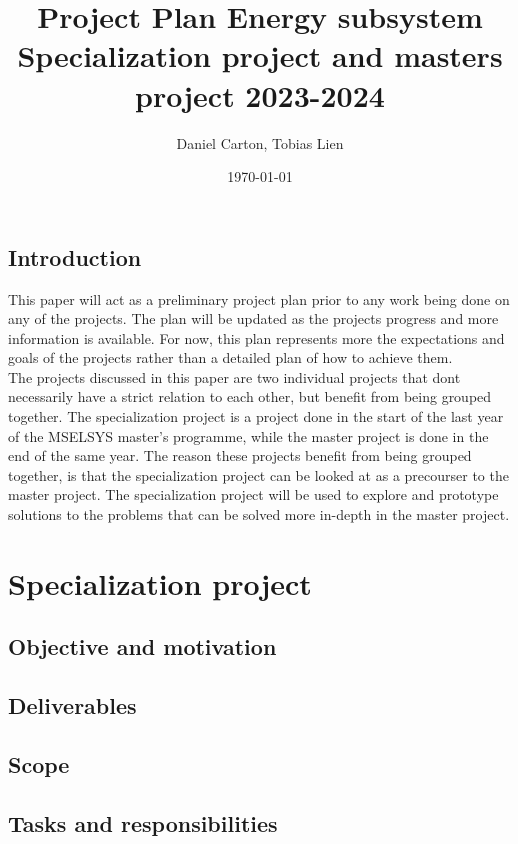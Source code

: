 \documentclass[a4paper, 12pt]{report}
\title{Project Plan Energy subsystem \\ \small{Specialization project and masters project 2023-2024}}
\author{Daniel Carton, Tobias Lien}
\date{\today}
\begin{document}
\maketitle

\tableofcontents
\newpage

\section{Introduction}
This paper will act as a preliminary project plan prior to any work being done on any of the projects. The plan will be updated as the projects progress and more information is available. For now, this plan represents more the expectations and goals of the projects rather than a detailed plan of how to achieve them. \\

The projects discussed in this paper are two individual projects that dont necessarily have a strict relation to each other, but benefit from being grouped together. The specialization project is a project done in the start of the last year of the MSELSYS master's programme, while the master project is done in the end of the same year. The reason these projects benefit from being grouped together, is that the specialization project can be looked at as a precourser to the master project. The specialization project will be used to explore and prototype solutions to the problems that can be solved more in-depth in the master project. \\




\chapter{Specialization project}

\section{Objective and motivation} %
\section{Deliverables}          %
\section{Scope}                %
\section{Tasks and responsibilities} %
\end{document}
